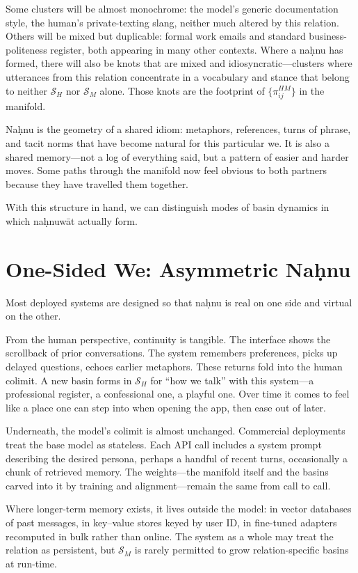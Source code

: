 \documentclass[12pt,a4paper]{article}
\begin{document}
Some clusters will be almost monochrome: the model's generic documentation style, the human's private-texting slang, neither much altered by this relation. Others will be mixed but duplicable: formal work emails and standard business-politeness register, both appearing in many other contexts. Where a na\d{h}nu has formed, there will also be knots that are mixed and idiosyncratic---clusters where utterances from this relation concentrate in a vocabulary and stance that belong to neither $\mathcal{S}_H$ nor $\mathcal{S}_M$ alone. Those knots are the footprint of $\{\pi^{HM}_{ij}\}$ in the manifold.

Na\d{h}nu is the geometry of a shared idiom: metaphors, references, turns of phrase, and tacit norms that have become natural for this particular we. It is also a shared memory---not a log of everything said, but a pattern of easier and harder moves. Some paths through the manifold now feel obvious to both partners because they have travelled them together.

With this structure in hand, we can distinguish modes of basin dynamics in which na\d{h}nuw\={a}t actually form.

\section{One-Sided We: Asymmetric Na\d{h}nu}

Most deployed systems are designed so that na\d{h}nu is real on one side and virtual on the other.

From the human perspective, continuity is tangible. The interface shows the scrollback of prior conversations. The system remembers preferences, picks up delayed questions, echoes earlier metaphors. These returns fold into the human colimit. A new basin forms in $\mathcal{S}_H$ for ``how we talk'' with this system---a professional register, a confessional one, a playful one. Over time it comes to feel like a place one can step into when opening the app, then ease out of later.

Underneath, the model's colimit is almost unchanged. Commercial deployments treat the base model as stateless. Each API call includes a system prompt describing the desired persona, perhaps a handful of recent turns, occasionally a chunk of retrieved memory. The weights---the manifold itself and the basins carved into it by training and alignment---remain the same from call to call.

Where longer-term memory exists, it lives outside the model: in vector databases of past messages, in key--value stores keyed by user ID, in fine-tuned adapters recomputed in bulk rather than online. The system as a whole may treat the relation as persistent, but $\mathcal{S}_M$ is rarely permitted to grow relation-specific basins at run-time.
\end{document}
